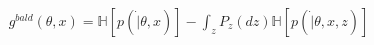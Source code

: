 \documentclass[preview]{standalone}
\begin{document}
\begin{align*}
g^{bald}(\theta, x) = \mathbb{H}[p(\dot |\theta, x)] - \int_z P_z (dz)\mathbb{H}[p(\dot |\theta, x,z)]
\end{align*}
\end{document}
